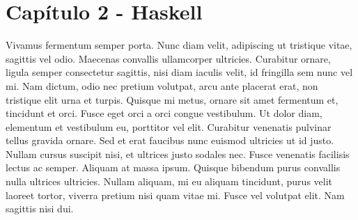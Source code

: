 \chapter*{Capítulo 2 - Haskell}
\label{ch:haskell}

Vivamus fermentum semper porta. Nunc diam velit, adipiscing ut tristique vitae, sagittis vel odio. Maecenas convallis ullamcorper ultricies. Curabitur ornare, ligula semper consectetur sagittis, nisi diam iaculis velit, id fringilla sem nunc vel mi. Nam dictum, odio nec pretium volutpat, arcu ante placerat erat, non tristique elit urna et turpis. Quisque mi metus, ornare sit amet fermentum et, tincidunt et orci. Fusce eget orci a orci congue vestibulum. Ut dolor diam, elementum et vestibulum eu, porttitor vel elit. Curabitur venenatis pulvinar tellus gravida ornare. Sed et erat faucibus nunc euismod ultricies ut id justo. Nullam cursus suscipit nisi, et ultrices justo sodales nec. Fusce venenatis facilisis lectus ac semper. Aliquam at massa ipsum. Quisque bibendum purus convallis nulla ultrices ultricies. Nullam aliquam, mi eu aliquam tincidunt, purus velit laoreet tortor, viverra pretium nisi quam vitae mi. Fusce vel volutpat elit. Nam sagittis nisi dui.